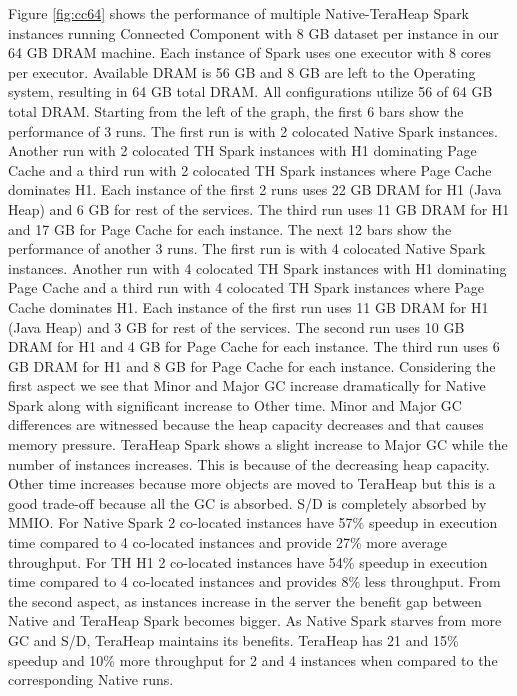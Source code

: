 Figure \ref{fig:cc64} shows the performance of multiple
Native-TeraHeap Spark instances running Connected Component with 8 GB
dataset per instance in our 64 GB DRAM machine. Each instance of Spark
uses one executor with 8 cores per executor. Available DRAM is 56 GB
and 8 GB are left to the Operating system, resulting in 64 GB total
DRAM. All configurations utilize 56 of 64 GB total DRAM.
Starting from the left of the graph, the first 6 bars show the
performance of 3 runs. The first run is with 2 colocated Native Spark instances.
Another run with 2 colocated TH Spark instances with H1 dominating Page Cache
and a third run with 2 colocated TH Spark instances where Page Cache dominates H1.
Each instance of the first 2 runs uses 22 GB DRAM for H1 (Java Heap) and 6 GB for rest of the services.
The third run uses 11 GB DRAM for H1 and 17 GB for Page Cache for each instance. 
The next 12 bars show the performance of another 3 runs. The first run is with 4 colocated Native Spark instances.
Another run with 4 colocated TH Spark instances with H1 dominating Page Cache
and a third run with 4 colocated TH Spark instances where Page Cache dominates H1.
Each instance of the first run uses 11 GB DRAM for H1 (Java Heap) and 3 GB for rest of the services.
The second run uses 10 GB DRAM for H1 and 4 GB for Page Cache for each instance.
The third run uses 6 GB DRAM for H1 and 8 GB for Page Cache for each instance.
Considering the first aspect we see that Minor and Major GC increase dramatically for Native Spark along with significant increase to Other time. Minor and Major GC differences are witnessed because the heap capacity decreases and that causes memory pressure. TeraHeap Spark shows a slight increase to Major GC while the number of instances increases. This is because of the decreasing heap capacity. Other time increases because more objects are moved to TeraHeap but this is a good trade-off because all the GC is absorbed. S/D is completely absorbed by MMIO. For Native Spark 2 co-located instances have 57\% speedup in execution time compared to 4 co-located instances and provide 27\% more average throughput. For TH H1 2 co-located instances have 54\% speedup in execution time compared to 4 co-located instances and provides 8\% less throughput.
From the second aspect, as instances increase in the server the benefit gap between Native and TeraHeap Spark becomes bigger. As Native Spark starves from more GC and S/D, TeraHeap maintains its benefits. TeraHeap has 21 and 15\% speedup and 10\% more throughput for 2 and 4 instances when compared to the corresponding Native runs.

